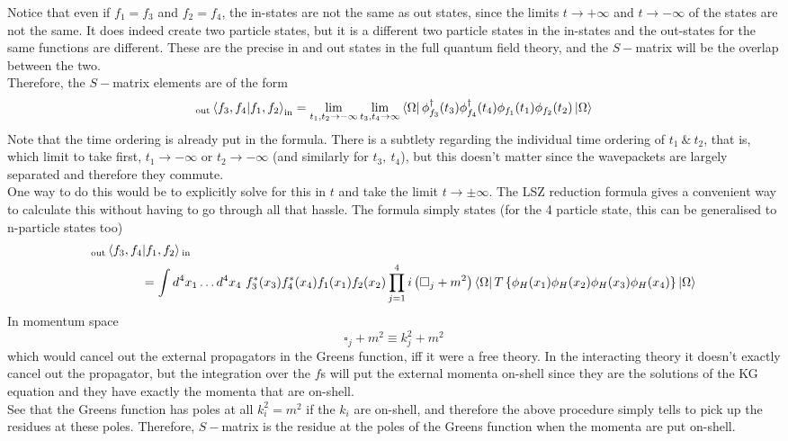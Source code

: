 \documentclass[11pt]{article}
\numberwithin{equation}{section}
\begin{document}
Notice that even if \(f_1 = f_3\) and \(f_2 = f_4\), the in-states are not the same as out states, since the limits \(t\to+\infty\) and \(t\to -\infty\) of the states are not the same. It does indeed create two particle states, but it is a different two particle states in the in-states and the out-states for the same functions are different. These are the precise in and out states in the full quantum field theory, and the \(S-\)matrix will be the overlap between the two. \\

Therefore, the \(S-\)matrix elements are of the form 
\begin{equation*}
    {}_{\text{out}}\braket{f_3, f_4|f_1, f_2}_{\text{in}} = \lim_{t_1, t_2 \to -\infty}\lim_{t_3,t_4\to \infty} \bra{\Omega} \phi_{f_3}^\dagger(t_3)\phi_{f_4}^\dagger(t_4)\phi_{f_1}(t_1)\phi_{f_2}(t_2)\ket{\Omega}
\end{equation*}
Note that the time ordering is already put in the formula. There is a subtlety regarding the individual time ordering of \(t_1 ~\&~ t_2\), that is, which limit to take first, \(t_1\to -\infty\) or \(t_2\to -\infty\) (and similarly for \(t_3,~t_4\)), but this doesn't matter since the wavepackets are largely separated and therefore they commute. \\

One way to do this would be to explicitly solve for this in \(t\) and take the limit \(t\to \pm \infty\). The LSZ reduction formula gives a convenient way to calculate this without having to go through all that hassle. The formula simply states (for the 4 particle state, this can be generalised to n-particle states too)
\begin{align*}
    &{}_{\text{out}}\braket{f_3, f_4|f_1, f_2}{}_{\text{in}} \\
    &~~~~~~~~~~~~= \int d^4x_1 \ldots d^4x_4 ~f_3^*(x_3)f_4^*(x_4)f_1(x_1)f_2(x_2) \prod_{j=1}^4i\left(\square_j + m^2 \right) \bra{\Omega}T\left\{ \phi_H(x_1)\phi_H(x_2)\phi_H(x_3)\phi_H(x_4) \right\}\ket{\Omega}
\end{align*}
In momentum space 
\begin{equation*}
    \square_j + m^2 \equiv k_j^2 + m^2
\end{equation*}
which would cancel out the external propagators in the Greens function, iff it were a free theory. In the interacting theory it doesn't exactly cancel out the propagator, but the integration over the \(f\)s will put the external momenta on-shell since they are the solutions of the KG equation and they have exactly the momenta that are on-shell. \\
See that the Greens function has poles at all \(k_i^2 = m^2\) if the \(k_i\) are on-shell, and therefore the above procedure simply tells to pick up the residues at these poles. Therefore, \(S-\)matrix is the residue at the poles of the Greens function when the momenta are put on-shell.\\
\end{document}
